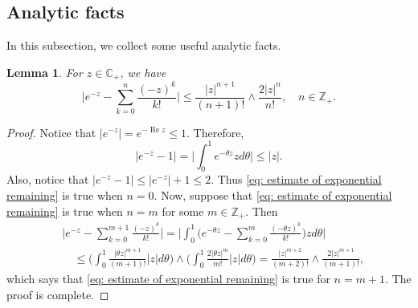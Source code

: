 \documentclass[12pt,a4paper]{amsart}
\theoremstyle{plain}
\newtheorem{lem}[thm]{Lemma}
\theoremstyle{definition}
\numberwithin{equation}{section}
\begin{document}
\subsection{Analytic facts}
    In this subsection, we collect some useful analytic facts.
\begin{lem}
\label{lem: estimate of exponential remaining}
    For $z\in \mathbb C_+$,  we have
\begin{equation}
\label{eq: estimate of exponential remaining}
    \Big|e^{-z} - \sum_{k=0}^n \frac{(-z)^k}{k!} \Big|
    \leq \frac{|z|^{n+1}}{(n+1)!} \wedge \frac{2|z|^{n}}{n!}, \quad n\in \mathbb Z_+.
\end{equation}
\end{lem}
\begin{proof}
    Notice that $|e^{-z}| = e^{- \operatorname{Re} z} \leq 1$.
    Therefore,
\begin{equation}
    |e^{-z} - 1| 
    = \Big| \int_0^1 e^{-\theta z} z d\theta\Big|
    \leq |z|.
\end{equation}
    Also, notice that $|e^{-z} - 1| \leq |e^{-z}|+1 \leq 2$.
    Thus \eqref{eq: estimate of exponential remaining} is true when $n = 0$.
    Now, suppose that \eqref{eq: estimate of exponential remaining} is true when $n = m$ for some $m \in \mathbb Z_+$.
    Then
\begin{equation}\begin{split}
    &\Big|e^{-z} - \sum_{k=0}^{m+1} \frac{(-z)^k}{k!}\Big|
    = \Big| \int_0^1\Big(e^{-\theta z} - \sum_{k=0}^m \frac{(-\theta z)^k}{k!} \Big) z d\theta \Big|
    \\&\quad \leq  \Big(\int_0^1 \frac{|\theta z|^{m+1}}{(m+1)!} |z| d\theta\Big) \wedge \Big(\int_0^1 \frac{2|\theta z|^{m}}{m!} |z| d\theta\Big)
    = \frac{|z|^{m+2}}{(m+2)!} \wedge \frac{2|z|^{m+1}}{(m+1)!},
\end{split}\end{equation}
    which says that \eqref{eq: estimate of exponential remaining} is true for $n = m + 1$.
    The proof is complete.
\end{proof}
\end{document}
